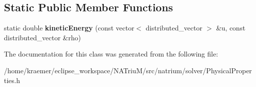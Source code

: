 \subsection*{Static Public Member Functions}
\begin{DoxyCompactItemize}
\item 
\hypertarget{classnatrium_1_1PhysicalProperties_accf6bf858e7719b7a82ed321059f1450}{static double {\bfseries kinetic\-Energy} (const vector$<$ distributed\-\_\-vector $>$ \&u, const distributed\-\_\-vector \&rho)}\label{classnatrium_1_1PhysicalProperties_accf6bf858e7719b7a82ed321059f1450}

\end{DoxyCompactItemize}


The documentation for this class was generated from the following file\-:\begin{DoxyCompactItemize}
\item 
/home/kraemer/eclipse\-\_\-workspace/\-N\-A\-Triu\-M/src/natrium/solver/Physical\-Properties.\-h\end{DoxyCompactItemize}
